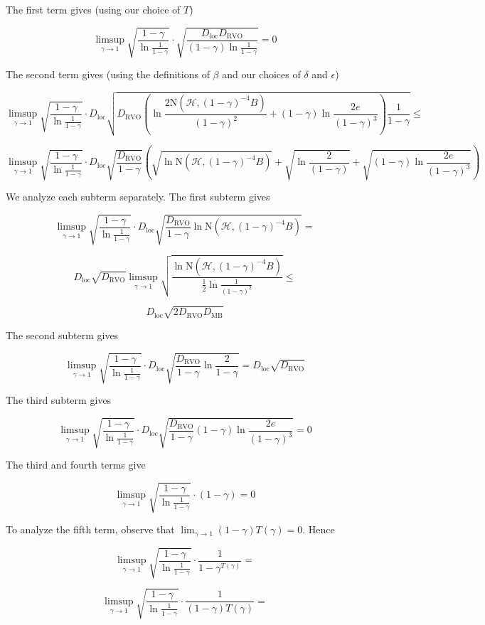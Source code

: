 \documentclass[a4paper]{article}
\newcommand{\AP}[1]{\left(#1\right)}
\newcommand{\B}{B}
\newcommand{\Hy}{\mathcal{H}}
\newcommand{\DRVO}{D_{\mathrm{RVO}}}
\newcommand{\DMB}{D_{\mathrm{MB}}}
\newcommand{\DL}{D_{\mathrm{loc}}}
\newcommand{\N}{\mathrm{N}}
\begin{document}
The first term gives (using our choice of $T$)

$$\limsup_{\gamma\rightarrow1}{\sqrt{\frac{1-\gamma}{\ln{\frac{1}{1-\gamma}}}}\cdot\sqrt{\frac{\DL\DRVO}{(1-\gamma)\ln\frac{1}{1-\gamma}}}} = 0$$

The second term gives (using the definitions of $\beta$ and our choices of $\delta$ and $\epsilon$)

$$\limsup_{\gamma\rightarrow1}{\sqrt{\frac{1-\gamma}{\ln{\frac{1}{1-\gamma}}}}\cdot\DL\sqrt{\DRVO\AP{\ln{\frac{2\N\AP{\Hy,(1-\gamma)^{-4}\B}}{(1-\gamma)^2}}+(1-\gamma) \ln{\frac{2e}{(1-\gamma)^3}}}\frac{1}{1-\gamma}}}\leq$$

$$\limsup_{\gamma\rightarrow1}{\sqrt{\frac{1-\gamma}{\ln{\frac{1}{1-\gamma}}}}\cdot\DL\sqrt{\frac{\DRVO}{1-\gamma}}\AP{\sqrt{\ln {\N\AP{\Hy,(1-\gamma)^{-4}\B}}}+\sqrt{\ln{\frac{2}{(1-\gamma)}}}+\sqrt{(1-\gamma) \ln{\frac{2e}{(1-\gamma)^3}}}}}$$

We analyze each subterm separately. The first subterm gives

$$\limsup_{\gamma\rightarrow1}{\sqrt{\frac{1-\gamma}{\ln{\frac{1}{1-\gamma}}}}\cdot\DL\sqrt{\frac{\DRVO}{1-\gamma}\ln{\N\AP{\Hy,(1-\gamma)^{-4}\B }}}}=$$

$$\DL\sqrt{\DRVO}\limsup_{\gamma\rightarrow1}{\sqrt{\frac{\ln{\N\AP{\Hy,(1-\gamma)^{-4}\B}}}{\frac{1}{2}\ln{\frac{1}{(1-\gamma)^2}}}}}\leq$$

$$\DL\sqrt{2\DRVO\DMB}$$

The second subterm gives

$$\limsup_{\gamma\rightarrow1}{\sqrt{\frac{1-\gamma}{\ln{\frac{1}{1-\gamma}}}}\cdot\DL\sqrt{\frac{\DRVO}{1-\gamma}\ln{\frac{2}{1-\gamma}}}}=\DL\sqrt{\DRVO}$$

The third subterm gives

$$\limsup_{\gamma\rightarrow1}{\sqrt{\frac{1-\gamma}{\ln{\frac{1}{1-\gamma}}}}\cdot\DL\sqrt{\frac{\DRVO}{1-\gamma}(1-\gamma) \ln{\frac{2e}{(1-\gamma)^3}}}}=0$$

The third and fourth terms give

$$\limsup_{\gamma\rightarrow1}{\sqrt{\frac{1-\gamma}{\ln{\frac{1}{1-\gamma}}}}\cdot(1-\gamma)}=0$$

To analyze the fifth term, observe that $\lim_{\gamma\rightarrow1}{(1-\gamma)T(\gamma)}=0$. Hence

$$\limsup_{\gamma\rightarrow1}{\sqrt{\frac{1-\gamma}{\ln{\frac{1}{1-\gamma}}}}\cdot\frac{1}{1-\gamma^{T(\gamma)}}}=$$

$$\limsup_{\gamma\rightarrow1}{\sqrt{\frac{1-\gamma}{\ln{\frac{1}{1-\gamma}}}}\cdot\frac{1}{(1-\gamma)T(\gamma)}}=$$
\end{document}
